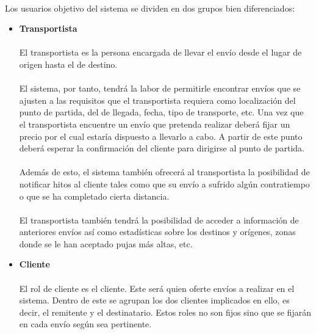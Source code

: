 \documentclass[10pt, a4paper,spanish]{article}
\begin{document}
			\paragraph{}
			Los usuarios objetivo del sistema se dividen en dos grupos bien diferenciados:

			\begin{itemize}


				\item{\textbf{Transportista}}

				\paragraph{}
				El transportista es la persona encargada de llevar el envío desde el lugar de origen hasta el de destino.

				\paragraph{}
				El sistema, por tanto, tendrá la labor de permitirle encontrar envíos que se ajusten a las requisitos que el transportista requiera como localización del punto de partida, del de llegada, fecha, tipo de transporte, etc. Una vez que el transportista encuentre un envío que pretenda realizar deberá fijar un precio por el cual estaría dispuesto a llevarlo a cabo. A partir de este punto deberá esperar la confirmación del cliente para dirigirse al punto de partida.

				\paragraph{}
				Además de esto, el sistema también ofrecerá al transportista la posibilidad de notificar hitos al cliente tales como que su envío a sufrido algún contratiempo o que se ha completado cierta distancia.

				\paragraph{}
				El transportista también tendrá la posibilidad de acceder a información de anteriores envíos así como estadísticas sobre los destinos y orígenes, zonas donde se le han aceptado pujas más altas, etc.


				\item{\textbf{Cliente}}
				\paragraph{}
				El rol de cliente es el cliente. Este será quien oferte envíos a realizar en el sistema. Dentro de este se agrupan los dos clientes implicados en ello, es decir, el remitente y el destinatario. Estos roles no son fijos sino que se fijarán en cada envío según sea pertinente.


\end{itemize}
\end{document}
